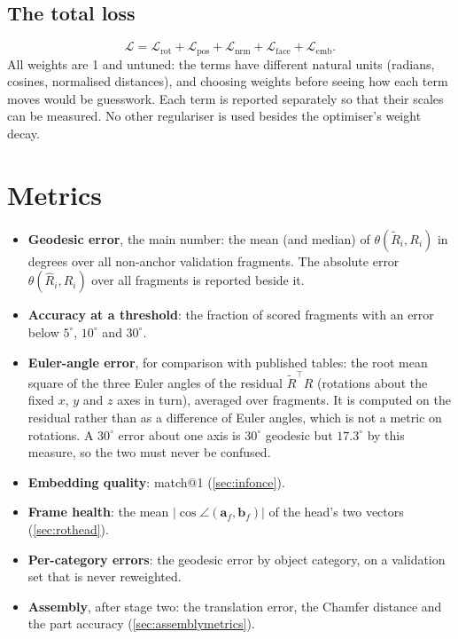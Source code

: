 \documentclass[11pt,a4paper]{article}
\theoremstyle{remark}
\newcommand{\T}{^{\top}}
\begin{document}
\subsection{The total loss}
\begin{equation}
  \mathcal L=\mathcal L_{\mathrm{rot}}+\mathcal L_{\mathrm{pos}}+\mathcal L_{\mathrm{nrm}}+\mathcal L_{\mathrm{face}}+\mathcal L_{\mathrm{emb}} .
\end{equation}
All weights are 1 and untuned: the terms have different natural units (radians, cosines, normalised distances), and choosing weights before seeing how each term moves would be guesswork. Each term is reported separately so that their scales can be measured. No other regulariser is used besides the optimiser's weight decay.

\section{Metrics}
\label{sec:metrics}

\begin{itemize}
  \item \textbf{Geodesic error}, the main number: the mean (and median) of $\theta(\tilde R_i,R_i)$ in degrees over all non-anchor validation fragments. The absolute error $\theta(\hat R_i,R_i)$ over all fragments is reported beside it.
  \item \textbf{Accuracy at a threshold}: the fraction of scored fragments with an error below $5^\circ$, $10^\circ$ and $30^\circ$.
  \item \textbf{Euler-angle error}, for comparison with published tables: the root mean square of the three Euler angles of the residual $\tilde R\T R$ (rotations about the fixed $x$, $y$ and $z$ axes in turn), averaged over fragments. It is computed on the residual rather than as a difference of Euler angles, which is not a metric on rotations. A $30^\circ$ error about one axis is $30^\circ$ geodesic but $17.3^\circ$ by this measure, so the two must never be confused.
  \item \textbf{Embedding quality}: match@1 (\cref{sec:infonce}).
  \item \textbf{Frame health}: the mean $|\cos\angle(\mathbf a_f,\mathbf b_f)|$ of the head's two vectors (\cref{sec:rothead}).
  \item \textbf{Per-category errors}: the geodesic error by object category, on a validation set that is never reweighted.
  \item \textbf{Assembly}, after stage two: the translation error, the Chamfer distance and the part accuracy (\cref{sec:assemblymetrics}).
\end{itemize}
\end{document}
